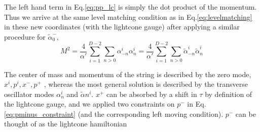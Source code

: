 \documentclass{article}
\begin{document}
The left hand term in Eq.\eqref{eq:pp_lc} is simply the dot product of the momentum. Thus we arrive at the same level matching condition as in Eq.\eqref{eq:levelmatching} in these new coordinates (with the lightcone gauge) after applying a similar procedure for $\tilde{\alpha}_0^-$,
\begin{equation}
	M^2 = \frac{4}{\alpha'}\sum_{i=1}^{D-2}\sum_{n>0}\alpha_{-n}^i\alpha_n^i=\frac{4}{\alpha'}\sum_{i=1}^{D-2}\sum_{n>0}\tilde{\alpha}_{-n}^i\tilde{\alpha}_n^i\label{eq:masshell}
\end{equation}

The center of mass and momentum of the string is described by the zero mode, $x^i, p^i, x^-, p^+$ , whereas the most general solution is described by the transverse oscillator modes $\alpha_n^i$ and $\tilde{\alpha}n^i$. $x^+$ can be absorbed by a shift in $\tau$ by definition of the lightcone gauge, and we applied two constraints on $p^-$ in Eq. \eqref{eq:pminus_constraint} (and the corresponding left moving condition). $p^-$ can be thought of as the lightcone hamiltonian\\
\end{document}
